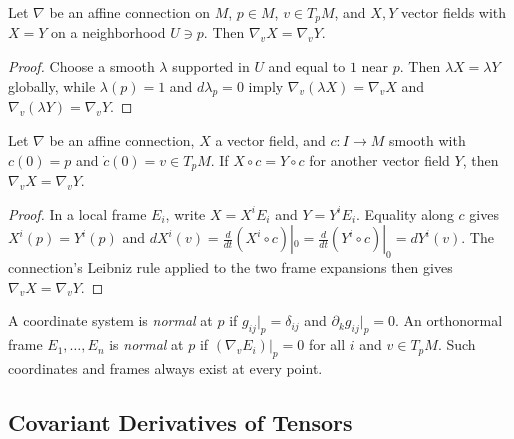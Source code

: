 \begin{lemma}
  \label{lem:pet-ch2-locality-open-set}
  \leanok
  Let $\nabla$ be an affine connection on $M$, $p\in M$, $v\in T_pM$, and
  $X,Y$ vector fields with $X=Y$ on a neighborhood $U\ni p$. Then
  $\nabla_vX=\nabla_vY$.
\end{lemma}
\begin{proof}
  \leanok
  \sketch
  Choose a smooth $\lambda$ supported in
  $U$ and equal to $1$ near $p$. Then $\lambda X=\lambda Y$ globally, while
  $\lambda(p)=1$ and $d\lambda_p=0$ imply
  $\nabla_v(\lambda X)=\nabla_vX$ and
  $\nabla_v(\lambda Y)=\nabla_vY$.
\end{proof}

\begin{lemma}
  \label{lem:pet-ch2-locality-along-curve}
  \leanok
  Let $\nabla$ be an affine connection, $X$ a vector field, and $c:I\to M$
  smooth with $c(0)=p$ and $\dot c(0)=v\in T_pM$. If $X\circ c=Y\circ c$
  for another vector field $Y$, then $\nabla_vX=\nabla_vY$.
\end{lemma}
\begin{proof}
  \leanok
  \sketch
  In a local frame $E_i$, write
  $X=X^iE_i$ and $Y=Y^iE_i$. Equality along $c$ gives
  $X^i(p)=Y^i(p)$ and
  $dX^i(v)=\frac d{dt}(X^i\circ c)|_0
          =\frac d{dt}(Y^i\circ c)|_0=dY^i(v)$.
  The connection's Leibniz rule applied to the two frame expansions then
  gives $\nabla_vX=\nabla_vY$.
\end{proof}

\begin{definition}
  \label{def:pet-ch2-normal-coordinates-frame}
  \leanok
  A coordinate system is \emph{normal} at $p$ if $g_{ij}|_p=\delta_{ij}$ and
  $\partial_kg_{ij}|_p=0$. An orthonormal frame $E_1,\dots,E_n$ is \emph{normal}
  at $p$ if $(\nabla_vE_i)|_p=0$ for all $i$ and $v\in T_pM$. Such coordinates
  and frames always exist at every point.
\end{definition}

\subsection{Covariant Derivatives of Tensors}

